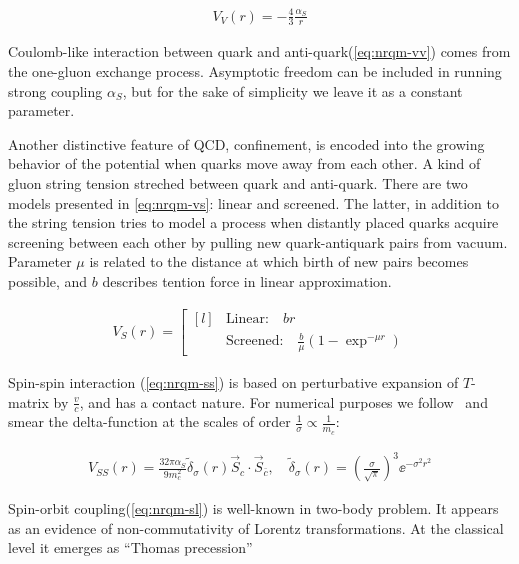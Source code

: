 \begin{align} \label{eq:nrqm-vv}
    V_V(r) = -\frac{4}{3} \frac{\alpha_S}{r}
\end{align}

Coulomb-like interaction between quark and anti-quark(\cref{eq:nrqm-vv}) comes from the one-gluon exchange process. Asymptotic freedom can be included in running strong coupling $\alpha_S$, but for the sake of simplicity we leave it as a constant parameter.

Another distinctive feature of QCD, confinement, is encoded into the growing behavior of the potential when quarks move away from each other. A kind of gluon string tension streched between quark and anti-quark. There are two models presented in \cref{eq:nrqm-vs}: linear and screened. The latter, in addition to the string tension tries to model a process when distantly placed quarks acquire screening between each other by pulling new quark-antiquark pairs from vacuum. Parameter $\mu$ is related to the distance at which birth of new pairs becomes possible, and $b$ describes tention force in linear approximation.

\begin{align} \label{eq:nrqm-vs}
    V_S(r) = \left[ \begin{matrix*}[l]
                    &\text{Linear:}\quad br \\
                    &\text{Screened:}\quad \frac{b}{\mu} (1 - \exp^{-\mu r})
              \end{matrix*} \right.
\end{align}

Spin-spin interaction (\cref{eq:nrqm-ss}) is based on perturbative expansion of $T$-matrix by $\frac{v}{c}$, and has a contact nature. For numerical purposes we follow~\cite{gbs-model} and smear the delta-function at the scales of order $\frac{1}{\sigma} \propto \frac{1}{m_c}$:

\begin{align} \label{eq:nrqm-ss}
    V_{SS}(r) = \frac{32 \pi \alpha_S}{9 m_c^2} \tilde{\delta}_\sigma(r) \vec{S}_c \cdot \vec{S}_{\bar{c}},\quad \tilde{\delta}_\sigma(r) = \left(\frac{\sigma}{\sqrt{\pi}}\right)^3 \ee^{-\sigma^2 r^2}
\end{align}

Spin-orbit coupling(\cref{eq:nrqm-sl}) is well-known in two-body problem. It appears as an evidence of non-commutativity of Lorentz transformations. At the classical level it emerges as ``Thomas precession''~\cite{thomas}

